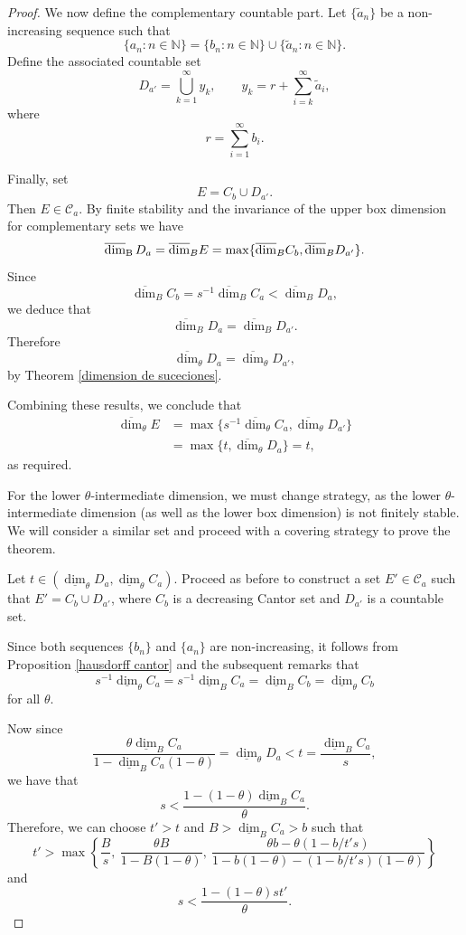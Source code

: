 \documentclass[11pt,reqno,bookmarksnumbered,raiselinks,breaklinks,colorlinks,plainpages]{amsart}
\newcommand\ubd{\overline{\mbox{\rm dim}}_{\rm B}\,} %
\begin{document}
\begin{proof}
We now define the complementary countable part. Let $\{\tilde{a}_n\}$ be a non-increasing sequence such that
\[
\{a_n : n \in \mathbb{N}\} = \{b_n : n \in \mathbb{N}\} \cup \{\tilde{a}_n : n \in \mathbb{N}\}.
\]
Define the associated countable set
\[
D_{a'} = \bigcup_{k=1}^{\infty} y_k, \qquad y_k = r + \sum_{i=k}^\infty \tilde{a}_i,
\]
where
\[
r = \sum_{i=1}^{\infty} b_i.
\]

Finally, set
\[
E = C_b \cup D_{a'}.
\]
Then \(E \in \mathcal{C}_a\). By finite stability and the invariance of the upper box dimension for complementary sets we have
\[
\ubd D_a =\overline{\dim}_B E = \max\{\overline{\dim}_B C_b, \overline{\dim}_B D_{a'}\}.
\]
Since
\[
\overline{\dim}_B C_b = s^{-1}\overline{\dim}_B C_a < \overline{\dim}_B D_a,
\]
we deduce that
\[
\overline{\dim}_B D_a = \overline{\dim}_B D_{a'}.
\]
Therefore
\[
\overline{\dim}_\theta D_a = \overline{\dim}_\theta D_{a'},
\]
by Theorem \ref{dimension de suceciones}.

Combining these results, we conclude that
\begin{align*}
\overline{\dim}_\theta E
&= \max\{s^{-1}\overline{\dim}_\theta C_a , \overline{\dim}_\theta D_{a'}\} \\
&= \max\{t, \overline{\dim}_\theta D_a\} = t,
\end{align*}
as required.


For the lower $\theta$-intermediate dimension, we must change strategy, as the lower $\theta$-intermediate dimension (as well as the lower box dimension) is not finitely stable. We will consider a similar set and proceed with a covering strategy to prove the theorem.

Let \( t \in (\underline{\dim}_\theta D_a, \underline{\dim}_\theta C_a) \). Proceed as before to construct a set \( E' \in \mathcal{C}_a \) such that \( E' = C_b \cup D_{a'} \), where $C_b$ is a decreasing Cantor set and \( D_{a'} \) is a countable set.

Since both sequences \( \{b_n\} \) and \( \{a_n\} \) are non-increasing, it follows from Proposition \ref{hausdorff cantor} and the subsequent remarks that \[ s^{-1}\underline{\dim}_\theta C_a = s^{-1}\underline{\dim}_B C_a = \underline{\dim}_B C_b = \underline{\dim}_\theta C_b  \] for all \( \theta \).

Now since  
\[
\frac{\theta \underline{\dim}_B C_a}{1 - \underline{\dim}_B C_a (1 - \theta)} = \underline{\dim}_\theta D_a < t = \frac{\underline{\dim}_B C_a}{s},
\]  
we have that  
\[
s < \frac{1 - (1 - \theta) \underline{\dim}_B C_a}{\theta}.
\]  
Therefore, we can choose \( t' > t \) and \( B > \underline{\dim}_B C_a > b \) such that  
\begin{equation}\label{condicion s}
t' > \max\left\{ \frac{B}{s},\ \frac{\theta B}{1 - B(1 - \theta)},\ \frac{\theta b - \theta(1 - b / t's)}{1 - b(1 - \theta) - (1 - b / t's)(1 - \theta)} \right\}
\end{equation}  
and  
\begin{equation}\label{condicion s 2}
s < \frac{1 - (1 - \theta) s t'}{\theta}.
\end{equation}


\end{proof}
\end{document}
